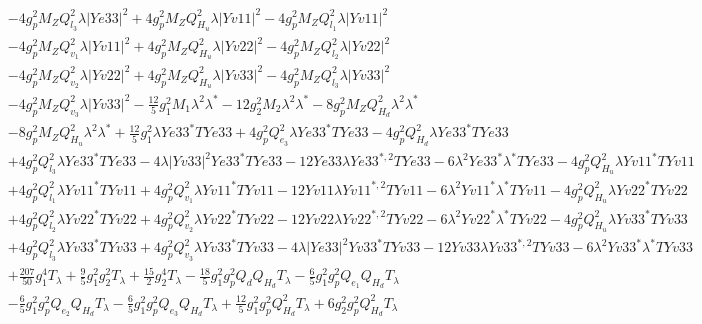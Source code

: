 \begin{align}
 &-4 g_{p}^{2} M_Z Q_{l_3}^{2} \lambda |Ye33|^2 +4 g_{p}^{2} M_Z Q_{H_u}^{2} \lambda |Yv11|^2 -4 g_{p}^{2} M_Z Q_{l_1}^{2} \lambda |Yv11|^2 \nonumber \\ 
 &-4 g_{p}^{2} M_Z Q_{v_1}^{2} \lambda |Yv11|^2 +4 g_{p}^{2} M_Z Q_{H_u}^{2} \lambda |Yv22|^2 -4 g_{p}^{2} M_Z Q_{l_2}^{2} \lambda |Yv22|^2 \nonumber \\ 
 &-4 g_{p}^{2} M_Z Q_{v_2}^{2} \lambda |Yv22|^2 +4 g_{p}^{2} M_Z Q_{H_u}^{2} \lambda |Yv33|^2 -4 g_{p}^{2} M_Z Q_{l_3}^{2} \lambda |Yv33|^2 \nonumber \\ 
 &-4 g_{p}^{2} M_Z Q_{v_3}^{2} \lambda |Yv33|^2 -\frac{12}{5} g_{1}^{2} M_1 \lambda^{2} \lambda^* -12 g_{2}^{2} M_2 \lambda^{2} \lambda^* -8 g_{p}^{2} M_Z Q_{H_d}^{2} \lambda^{2} \lambda^* \nonumber \\ 
 &-8 g_{p}^{2} M_Z Q_{H_u}^{2} \lambda^{2} \lambda^* +\frac{12}{5} g_{1}^{2} \lambda Ye33^* TYe33 +4 g_{p}^{2} Q_{e_3}^{2} \lambda Ye33^* TYe33 -4 g_{p}^{2} Q_{H_d}^{2} \lambda Ye33^* TYe33 \nonumber \\ 
 &+4 g_{p}^{2} Q_{l_3}^{2} \lambda Ye33^* TYe33 -4 \lambda |Yv33|^2 Ye33^* TYe33 -12 Ye33 \lambda Ye33^{*,2} TYe33 -6 \lambda^{2} Ye33^* \lambda^* TYe33 -4 g_{p}^{2} Q_{H_u}^{2} \lambda Yv11^* TYv11 \nonumber \\ 
 &+4 g_{p}^{2} Q_{l_1}^{2} \lambda Yv11^* TYv11 +4 g_{p}^{2} Q_{v_1}^{2} \lambda Yv11^* TYv11 -12 Yv11 \lambda Yv11^{*,2} TYv11 -6 \lambda^{2} Yv11^* \lambda^* TYv11 -4 g_{p}^{2} Q_{H_u}^{2} \lambda Yv22^* TYv22 \nonumber \\ 
 &+4 g_{p}^{2} Q_{l_2}^{2} \lambda Yv22^* TYv22 +4 g_{p}^{2} Q_{v_2}^{2} \lambda Yv22^* TYv22 -12 Yv22 \lambda Yv22^{*,2} TYv22 -6 \lambda^{2} Yv22^* \lambda^* TYv22 -4 g_{p}^{2} Q_{H_u}^{2} \lambda Yv33^* TYv33 \nonumber \\ 
 &+4 g_{p}^{2} Q_{l_3}^{2} \lambda Yv33^* TYv33 +4 g_{p}^{2} Q_{v_3}^{2} \lambda Yv33^* TYv33 -4 \lambda |Ye33|^2 Yv33^* TYv33 -12 Yv33 \lambda Yv33^{*,2} TYv33 -6 \lambda^{2} Yv33^* \lambda^* TYv33 \nonumber \\ 
 &+\frac{207}{50} g_{1}^{4} T_{\lambda} +\frac{9}{5} g_{1}^{2} g_{2}^{2} T_{\lambda} +\frac{15}{2} g_{2}^{4} T_{\lambda} -\frac{18}{5} g_{1}^{2} g_{p}^{2} Q_{d} Q_{H_d} T_{\lambda} -\frac{6}{5} g_{1}^{2} g_{p}^{2} Q_{e_{1}} Q_{H_d} T_{\lambda} \nonumber \\ 
 &-\frac{6}{5} g_{1}^{2} g_{p}^{2} Q_{e_{2}} Q_{H_d} T_{\lambda} -\frac{6}{5} g_{1}^{2} g_{p}^{2} Q_{e_3} Q_{H_d} T_{\lambda} +\frac{12}{5} g_{1}^{2} g_{p}^{2} Q_{H_d}^{2} T_{\lambda} +6 g_{2}^{2} g_{p}^{2} Q_{H_d}^{2} T_{\lambda} \nonumber \\ 

\end{align}
